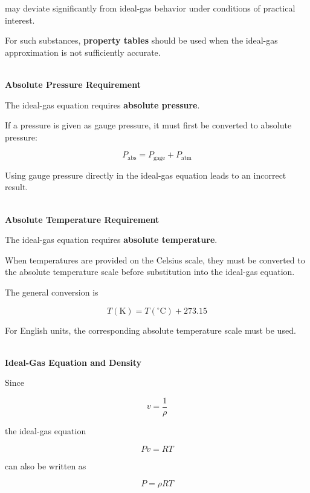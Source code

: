 \documentclass[12pt]{article}
\begin{document}
may deviate significantly from ideal-gas behavior under conditions of practical interest.

For such substances, \textbf{property tables} should be used when the ideal-gas approximation is not sufficiently accurate.

\textbf{\\ Absolute Pressure Requirement}

The ideal-gas equation requires \textbf{absolute pressure}.

If a pressure is given as gauge pressure, it must first be converted to absolute pressure:

\begin{equation*}
\boxed{
P_{\mathrm{abs}}
=
P_{\mathrm{gage}}+P_{\mathrm{atm}}
}
\end{equation*}

Using gauge pressure directly in the ideal-gas equation leads to an incorrect result.

\textbf{\\ Absolute Temperature Requirement}

The ideal-gas equation requires \textbf{absolute temperature}.

When temperatures are provided on the Celsius scale, they must be converted to the absolute temperature scale before substitution into the ideal-gas equation.

The general conversion is

\begin{equation*}
\boxed{T(\mathrm{K})=T(^\circ\mathrm{C})+273.15}
\end{equation*}

For English units, the corresponding absolute temperature scale must be used.

\textbf{\\ Ideal-Gas Equation and Density}

Since

\begin{equation*}
v=\frac{1}{\rho}
\end{equation*}

the ideal-gas equation

\begin{equation*}
Pv=RT
\end{equation*}

can also be written as

\begin{equation*}
\boxed{P=\rho RT}
\end{equation*}
\end{document}
